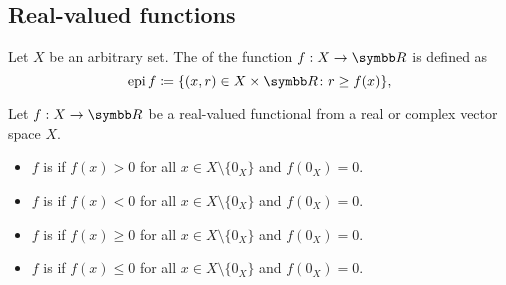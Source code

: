 \subsection{Real-valued functions}\label{subsec:real_valued_functions}

\begin{definition}\label{def:epigraph}
  Let \( X \) be an arbitrary set. The  of the function \( f: X \to \BR \) is defined as
  \begin{equation*}
    \Epi f \coloneqq \{ (x, r) \in X \times \BR \colon r \geq f(x) \},
  \end{equation*}
\end{definition}

\begin{definition}\label{def:function_definiteness}
  Let \( f: X \to \BR \) be a real-valued functional from a real or complex vector space \( X \).

  \begin{itemize}
    \item \( f \) is  if \( f(x) > 0 \) for all \( x \in X \setminus \{ 0_X \} \) and \( f(0_X) = 0 \).
    \item \( f \) is  if \( f(x) < 0 \) for all \( x \in X \setminus \{ 0_X \} \) and \( f(0_X) = 0 \).
    \item \( f \) is  if \( f(x) \geq 0 \) for all \( x \in X \setminus \{ 0_X \} \) and \( f(0_X) = 0 \).
    \item \( f \) is  if \( f(x) \leq 0 \) for all \( x \in X \setminus \{ 0_X \} \) and \( f(0_X) = 0 \).
  \end{itemize}
\end{definition}
